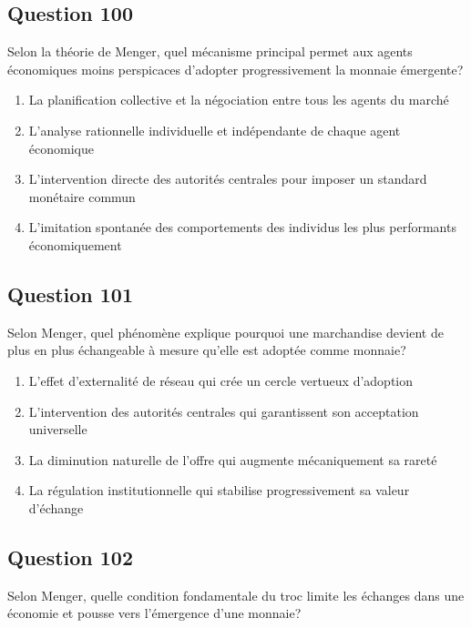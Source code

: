 \documentclass[12pt,a4paper]{article}
\begin{document}
\bigskip


\subsection*{Question 100}
Selon la théorie de Menger, quel mécanisme principal permet aux agents économiques moins perspicaces d'adopter progressivement la monnaie émergente?

\begin{enumerate}[label=\Alph*., leftmargin=*]
\item La planification collective et la négociation entre tous les agents du marché
\item L'analyse rationnelle individuelle et indépendante de chaque agent économique
\item L'intervention directe des autorités centrales pour imposer un standard monétaire commun
\item L'imitation spontanée des comportements des individus les plus performants économiquement
\end{enumerate}

\bigskip


\subsection*{Question 101}
Selon Menger, quel phénomène explique pourquoi une marchandise devient de plus en plus échangeable à mesure qu'elle est adoptée comme monnaie?

\begin{enumerate}[label=\Alph*., leftmargin=*]
\item L'effet d'externalité de réseau qui crée un cercle vertueux d'adoption
\item L'intervention des autorités centrales qui garantissent son acceptation universelle
\item La diminution naturelle de l'offre qui augmente mécaniquement sa rareté
\item La régulation institutionnelle qui stabilise progressivement sa valeur d'échange
\end{enumerate}

\bigskip


\subsection*{Question 102}
Selon Menger, quelle condition fondamentale du troc limite les échanges dans une économie et pousse vers l'émergence d'une monnaie?
\end{document}
